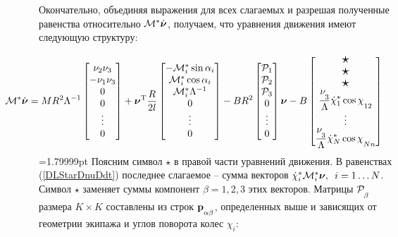 Окончательно, объединяя выражения для всех слагаемых и разрешая полученные равенства относительно $\mathcal{M}^*\dot{\boldsymbol{\mathbf{\nu}}}$, получаем, что уравнения движения имеют следующую структуру:

\begin{eqnarray*}
    \hspace{-45pt}
    \M^*\dot{\vnu} = 
    MR^2\Lambda^{-1}\begin{bmatrix}
        \nu_2\nu_3\\
        -\nu_1\nu_3\\
        0\\
        0\\
        \vdots
        \\
        0
    \end{bmatrix}
    +\vnu^\mathrm{T}
    \frac{R}{2l}
    \begin{bmatrix}
        -\M^*_i \sin\alpha_i\\
        \M^*_i \cos\alpha_i\\
        \M^*_i \Lambda^{-1}\\
        0\\
        \vdots
        \\
        0
    \end{bmatrix}
    -BR^2
    \begin{bmatrix}
        \Prhs_1\\
        \Prhs_2\\
        \Prhs_3\\
        0\\
        \vdots
        \\
        0
    \end{bmatrix}
    \vnu
    -B\begin{bmatrix}
        \scalebox{1.5}{$\star$}\\
        \scalebox{1.5}{$\star$}\\
        \scalebox{1.5}{$\star$}\\
        \fontdimen16\textfont2=5pt
        \ddfrac{\nu_3}{\Lambda}\dot{\chi}_1^*\cos\chi_{12}\\
        \vdots
        \\
        \ddfrac{\nu_3}{\Lambda}\dot{\chi}_N^*\cos\chi_{Nn}
    \end{bmatrix}
\end{eqnarray*}
\begin{equation}\label{eq:full_system}
\end{equation}
=1.79999pt
Поясним символ $\star$ в правой части уравнений движения. В равенствах (\ref{DLStarDnuDdt}) последнее слагаемое -- сумма векторов $\dot{\chi}_i^*\mathcal{M}^*_i\boldsymbol{\mathbf{\nu}}, \enspace i = 1 \ldots N$. Символ $\star$ заменяет суммы компонент $\beta = 1,2,3$ этих векторов. Матрицы $\Prhs_\beta$ размера $K\times K$ составлены из строк $\prhs_{\alpha\beta}$, определенных выше и зависящих от геометрии экипажа и углов поворота колес $\chi_i$:

